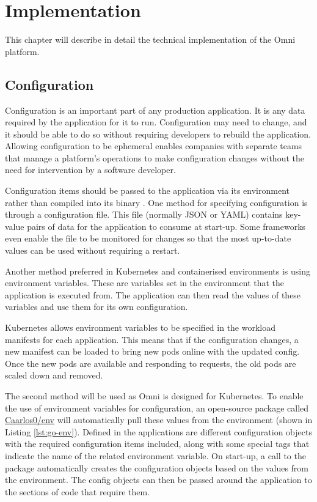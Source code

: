 \chapter{Implementation}
\label{cha:implementation}

This chapter will describe in detail the technical implementation of the Omni platform.

\section{Configuration}
Configuration is an important part of any production application. It is any data required by the application for it to run.
Configuration may need to change, and it should be able to do so without requiring developers to rebuild the application.
Allowing configuration to be ephemeral enables companies with separate teams that manage a platform's operations to make configuration changes without the need for intervention by a software developer.

Configuration items should be passed to the application via its environment rather than compiled into its binary \citep{12factorapp}.
One method for specifying configuration is through a configuration file. This file (normally JSON or YAML) contains key-value pairs of data for the application to consume at start-up.
Some frameworks even enable the file to be monitored for changes so that the most up-to-date values can be used without requiring a restart. 

Another method preferred in Kubernetes and containerised environments is using environment variables.
These are variables set in the environment that the application is executed from. The application can then read the values of these variables and use them for its own configuration.

Kubernetes allows environment variables to be specified in the workload manifests for each application.
This means that if the configuration changes, a new manifest can be loaded to bring new pods online with the updated config. Once the new pods are available and responding to requests, the old pods are scaled down and removed.



The second method will be used as Omni is designed for Kubernetes. To enable the use of environment variables for configuration, an open-source package called \underline{\href{https://github.com/caarlos0/env}{Caarlos0/env}} \nocite{env} will automatically pull these values from the environment (shown in Listing \ref{lst:go-env}).
Defined in the applications are different configuration objects with the required configuration items included, along with some special tags that indicate the name of the related environment variable.
On start-up, a call to the package automatically creates the configuration objects based on the values from the environment. The config objects can then be passed around the application to the sections of code that require them.

